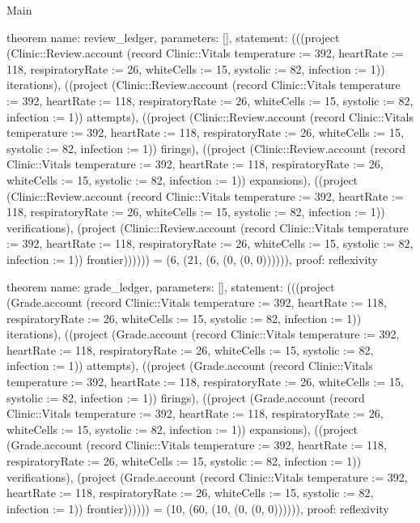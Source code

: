 \begin{lexlean}{Main}
\begin{semanticmodule}
theorem{
  name: review_ledger,
  parameters: [],
  statement: (((project (Clinic::Review.account (record Clinic::Vitals {temperature := 392, heartRate := 118, respiratoryRate := 26, whiteCells := 15, systolic := 82, infection := 1})) iterations), ((project (Clinic::Review.account (record Clinic::Vitals {temperature := 392, heartRate := 118, respiratoryRate := 26, whiteCells := 15, systolic := 82, infection := 1})) attempts), ((project (Clinic::Review.account (record Clinic::Vitals {temperature := 392, heartRate := 118, respiratoryRate := 26, whiteCells := 15, systolic := 82, infection := 1})) firings), ((project (Clinic::Review.account (record Clinic::Vitals {temperature := 392, heartRate := 118, respiratoryRate := 26, whiteCells := 15, systolic := 82, infection := 1})) expansions), ((project (Clinic::Review.account (record Clinic::Vitals {temperature := 392, heartRate := 118, respiratoryRate := 26, whiteCells := 15, systolic := 82, infection := 1})) verifications), (project (Clinic::Review.account (record Clinic::Vitals {temperature := 392, heartRate := 118, respiratoryRate := 26, whiteCells := 15, systolic := 82, infection := 1})) frontier)))))) = (6, (21, (6, (0, (0, 0)))))),
  proof: reflexivity{}
}

theorem{
  name: grade_ledger,
  parameters: [],
  statement: (((project (Grade.account (record Clinic::Vitals {temperature := 392, heartRate := 118, respiratoryRate := 26, whiteCells := 15, systolic := 82, infection := 1})) iterations), ((project (Grade.account (record Clinic::Vitals {temperature := 392, heartRate := 118, respiratoryRate := 26, whiteCells := 15, systolic := 82, infection := 1})) attempts), ((project (Grade.account (record Clinic::Vitals {temperature := 392, heartRate := 118, respiratoryRate := 26, whiteCells := 15, systolic := 82, infection := 1})) firings), ((project (Grade.account (record Clinic::Vitals {temperature := 392, heartRate := 118, respiratoryRate := 26, whiteCells := 15, systolic := 82, infection := 1})) expansions), ((project (Grade.account (record Clinic::Vitals {temperature := 392, heartRate := 118, respiratoryRate := 26, whiteCells := 15, systolic := 82, infection := 1})) verifications), (project (Grade.account (record Clinic::Vitals {temperature := 392, heartRate := 118, respiratoryRate := 26, whiteCells := 15, systolic := 82, infection := 1})) frontier)))))) = (10, (60, (10, (0, (0, 0)))))),
  proof: reflexivity{}
}


\end{semanticmodule}
\end{lexlean}
